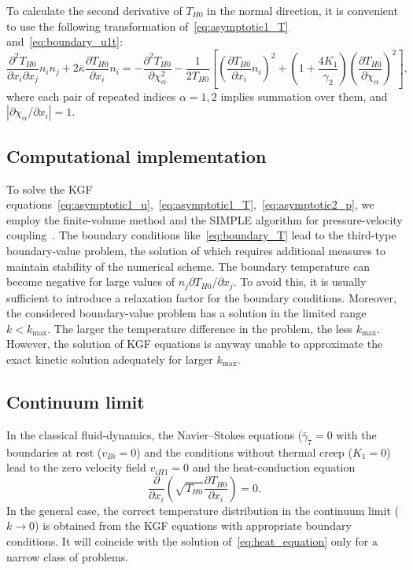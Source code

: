 \documentclass[10pt]{article}
\newcommand{\pder}[2][]{\frac{\partial#1}{\partial#2}}
\newcommand{\pderdual}[2][]{\frac{\partial^2#1}{\partial#2^2}}
\newcommand{\pderder}[3][]{\frac{\partial^2#1}{\partial#2\partial#3}}
\newcommand{\Pder}[2][]{\partial#1/\partial#2}
\begin{document}
To calculate the second derivative of \(T_{H0}\) in the normal direction,
it is convenient to use the following transformation of~\eqref{eq:asymptotic1_T} and~\eqref{eq:boundary_u1t}:
\begin{equation}\label{eq:Tnn}
    \pderder[T_{H0}]{x_i}{x_j}n_i n_j + 2\bar\kappa\pder[T_{H0}]{x_i}n_i =
    - \pderdual[T_{H0}]{\chi_\alpha} - \frac1{2T_{H0}} \left[
        \left(\pder[T_{H0}]{x_i}n_i\right)^2 +
        \left(1+\frac{4K_1}{\gamma_2}\right) \left(\pder[T_{H0}]{\chi_\alpha}\right)^2
    \right],
\end{equation}
where each pair of repeated indices \(\alpha=1,2\) implies summation over them, and \(|\Pder[\chi_\alpha]{x_i}| = 1\).

\subsection{Computational implementation}

To solve the KGF equations~\eqref{eq:asymptotic1_u},~\eqref{eq:asymptotic1_T},~\eqref{eq:asymptotic2_p},
we employ the finite-volume method and the SIMPLE algorithm for pressure-velocity coupling~\cite{Aoki2007}.
The boundary conditions like~\eqref{eq:boundary_T} lead to the third-type boundary-value problem,
the solution of which requires additional measures to maintain stability of the numerical scheme.
The boundary temperature can become negative for large values of \(n_j\Pder[T_{H0}]{x_j}\).
To avoid this, it is usually sufficient to introduce a relaxation factor for the boundary conditions.
Moreover, the considered boundary-value problem has a solution in the limited range \(k<k_{\max}\).
The larger the temperature difference in the problem, the less \(k_{\max}\).
However, the solution of KGF equations is anyway unable to approximate the exact kinetic solution
adequately for larger \(k_{\max}\).

\subsection{Continuum limit}

In the classical fluid-dynamics, the Navier--Stokes equations (\(\bar{\gamma}_7=0\)
with the boundaries at rest (\(v_{Bi}=0\)) and the conditions without thermal creep (\(K_1=0\))
lead to the zero velocity field \(v_{iH1}=0\) and the heat-conduction equation
\begin{equation}\label{eq:heat_equation}
    \pder{x_i}\left(\sqrt{T_{H0}}\pder[T_{H0}]{x_i}\right) = 0.
\end{equation}
In the general case, the correct temperature distribution in the continuum limit (\(k\to0\))
is obtained from the KGF equations with appropriate boundary conditions.
It will coincide with the solution of~\eqref{eq:heat_equation} only for a narrow class of problems.
\end{document}
